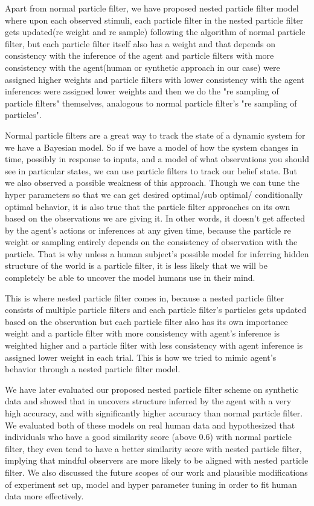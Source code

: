 \documentclass[12pt,letterpaper]{article}
\begin{document}
Apart from normal particle filter, we have proposed nested particle filter model where upon each observed stimuli, each particle filter in the nested particle filter gets updated(re weight and re sample) following the algorithm of normal particle filter, but each particle filter itself also has a weight and that depends on consistency with the inference of the agent and particle filters with more consistency with the agent(human or synthetic approach in our case) were assigned higher weights and particle filters with lower consistency with the agent inferences were assigned lower weights and then we do the "re sampling of particle filters" themselves, analogous to normal particle filter's "re sampling of particles".

Normal particle filters are a great way to track the state of a
dynamic system for we have a Bayesian model. So if we
have a model of how the system changes in time, possibly in response to inputs, and a model of what observations you should see in particular states, we can use particle filters to track our belief state. But we also observed a possible weakness of this approach. Though we can tune the hyper parameters so that we can get desired optimal/sub optimal/ conditionally optimal behavior, it is also true that the particle filter approaches on its own based on the observations we are giving it. In other words, it doesn't get affected by the agent's actions or inferences at any given time, because the particle re weight or sampling entirely depends on the consistency of observation with the particle. That is why unless a human subject's possible model for inferring hidden structure of the world is a particle filter, it is less likely that we will be completely be able to uncover the model humans use in their mind.

This is where nested particle filter comes in, because a nested particle filter consists of multiple particle filters and each particle filter's particles gets updated based on the observation but each particle filter also has its own importance weight and a particle filter with more consistency with agent's inference is weighted higher and a particle filter with less consistency with agent inference is assigned lower weight in each trial. This is how we tried to mimic agent's behavior through a nested particle filter model.


We have later evaluated our proposed nested particle filter scheme on synthetic data and showed that in uncovers structure inferred by the agent with a very high accuracy, and with significantly higher accuracy than normal particle filter. We evaluated both of these models on real human data and hypothesized that individuals who have a good similarity score (above 0.6) with normal particle filter, they even tend to have a better similarity score with nested particle filter, implying that mindful observers are more likely to be aligned with nested particle filter. We also discussed the future scopes of our work and plausible modifications of experiment set up, model and hyper parameter tuning in order to fit human data more effectively. 
\end{document}
